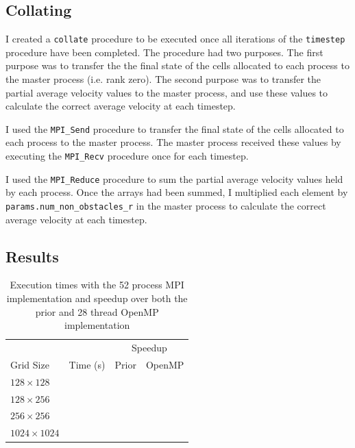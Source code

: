 \documentclass[twocolumn, a4paper]{article}
\begin{document}
\subsection{Collating}

I created a \texttt{collate} procedure to be executed once all iterations of the \texttt{timestep} procedure have been completed.
The procedure had two purposes.
The first purpose was to transfer the the final state of the cells allocated to each process to the master process (i.e. rank zero).
The second purpose was to transfer the partial average velocity values to the master process, and use these values to calculate the correct average velocity at each timestep.

I used the \texttt{MPI\_Send} procedure to transfer the final state of the cells allocated to each process to the master process.
The master process received these values by executing the \texttt{MPI\_Recv} procedure once for each timestep.

I used the \texttt{MPI\_Reduce} procedure to sum the partial average velocity values held by each process.
Once the arrays had been summed, I multiplied each element by \texttt{params.num\_non\_obstacles\_r} in the master process to calculate the correct average velocity at each timestep.

\subsection{Results}

\begin{table}[htbp]
  \begin{center}
  \caption{Execution times with the 52 process MPI implementation and speedup over both the prior and 28 thread OpenMP implementation}\label{tab:mpi}
  \begin{tabular}[t]{l | l  l  l} 
      \hline\hline
      &&\multicolumn{2}{c}{Speedup}\\
      \cline{3-4}
      Grid Size&Time (s)&Prior&OpenMP\\
      \hline
      $128 \times 128$&\texttt{}&\texttt{}&\texttt{}\\
      $128 \times 256$&\texttt{}&\texttt{}&\texttt{}\\
      $256 \times 256$&\texttt{}&\texttt{}&\texttt{}\\
      $1024 \times 1024$&\texttt{}&\texttt{}&\texttt{}\\
      \hline
    \end{tabular}
  \end{center}
\end{table}
\end{document}
